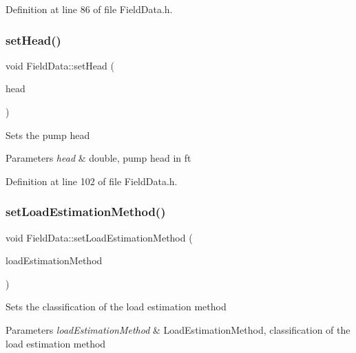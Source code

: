 Definition at line 86 of file Field\+Data.\+h.

\mbox{\label{class_field_data_af36f740ce0eb703903a18b5e2d8e0571}} 
\subsubsection{\texorpdfstring{set\+Head()}{setHead()}}
{\footnotesize\ttfamily void Field\+Data\+::set\+Head (\begin{DoxyParamCaption}\item[{const double}]{head }\end{DoxyParamCaption})\hspace{0.3cm}{\ttfamily [inline]}}

Sets the pump head 
\begin{DoxyParams}{Parameters}
{\em head} & double, pump head in ft \\
\hline
\end{DoxyParams}


Definition at line 102 of file Field\+Data.\+h.

\mbox{\label{class_field_data_a0c820da908989c650ebe5e9be640fd85}} 
\subsubsection{\texorpdfstring{set\+Load\+Estimation\+Method()}{setLoadEstimationMethod()}}
{\footnotesize\ttfamily void Field\+Data\+::set\+Load\+Estimation\+Method (\begin{DoxyParamCaption}\item[{const \hyperlink{class_field_data_a424e89914ba5684c01bb269dbe3312fd}{Load\+Estimation\+Method}}]{load\+Estimation\+Method }\end{DoxyParamCaption})\hspace{0.3cm}{\ttfamily [inline]}}

Sets the classification of the load estimation method 
\begin{DoxyParams}{Parameters}
{\em load\+Estimation\+Method} & Load\+Estimation\+Method, classification of the load estimation method \\
\hline
\end{DoxyParams}


